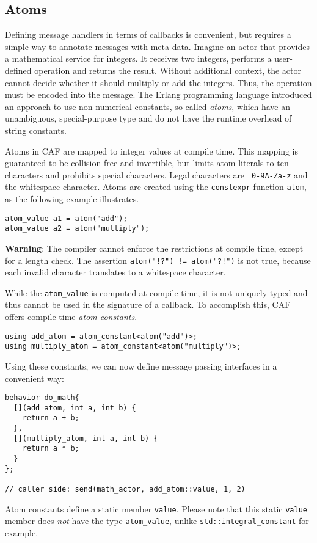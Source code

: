 \clearpage
\subsection{Atoms}
\label{atom}

Defining message handlers in terms of callbacks is convenient, but requires a
simple way to annotate messages with meta data. Imagine an actor that provides
a mathematical service for integers. It receives two integers, performs a
user-defined operation and returns the result. Without additional context, the
actor cannot decide whether it should multiply or add the integers. Thus, the
operation must be encoded into the message. The Erlang programming language
introduced an approach to use non-numerical constants, so-called
\textit{atoms}, which have an unambiguous, special-purpose type and do not have
the runtime overhead of string constants.

Atoms in CAF are mapped to integer values at compile time. This mapping is
guaranteed to be collision-free and invertible, but limits atom literals to ten
characters and prohibits special characters. Legal characters are
\lstinline^_0-9A-Za-z^ and the whitespace character. Atoms are created using
the \lstinline^constexpr^ function \lstinline^atom^, as the following example
illustrates.

\begin{lstlisting}
atom_value a1 = atom("add");
atom_value a2 = atom("multiply");
\end{lstlisting}

\textbf{Warning}: The compiler cannot enforce the restrictions at compile time,
except for a length check. The assertion \lstinline^atom("!?") != atom("?!")^
is not true, because each invalid character translates to a whitespace
character.

While the \lstinline^atom_value^ is computed at compile time, it is not
uniquely typed and thus cannot be used in the signature of a callback. To
accomplish this, CAF offers compile-time \emph{atom constants}.

\begin{lstlisting}
using add_atom = atom_constant<atom("add")>;
using multiply_atom = atom_constant<atom("multiply")>;
\end{lstlisting}

Using these constants, we can now define message passing interfaces in a
convenient way:

\begin{lstlisting}
behavior do_math{
  [](add_atom, int a, int b) {
    return a + b;
  },
  [](multiply_atom, int a, int b) {
    return a * b;
  }
};

// caller side: send(math_actor, add_atom::value, 1, 2)
\end{lstlisting}

Atom constants define a static member \lstinline^value^. Please note that this
static \lstinline^value^ member does \emph{not} have the type
\lstinline^atom_value^, unlike \lstinline^std::integral_constant^ for example.
